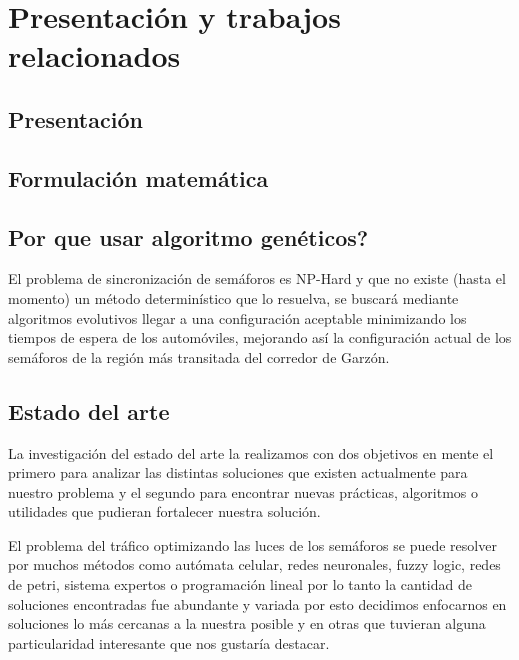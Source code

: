 \chapter{Presentación y trabajos relacionados}

\section{Presentación}
\section{Formulación matemática}

\section{Por que usar algoritmo genéticos?}
El problema de sincronización de semáforos es NP-Hard y que
no existe (hasta el momento) un método determinístico que lo
resuelva, se buscará mediante algoritmos evolutivos llegar a
una configuración aceptable minimizando los tiempos de
espera de los automóviles, mejorando así la configuración
actual de los semáforos de la región más transitada del corredor
de Garzón.

\section{Estado del arte}
La investigación del estado del arte la realizamos con dos objetivos en mente el primero para analizar las distintas soluciones que existen actualmente para nuestro problema y el segundo para encontrar nuevas prácticas, algoritmos o utilidades que pudieran fortalecer nuestra solución.

El problema del tráfico optimizando las luces de los semáforos se puede resolver por muchos métodos como autómata celular, redes neuronales, fuzzy logic, redes de petri, sistema expertos o programación lineal por lo tanto la cantidad de soluciones encontradas fue abundante y variada por esto decidimos enfocarnos en soluciones lo más cercanas a la nuestra posible y en otras que tuvieran alguna particularidad interesante que nos gustaría destacar.


